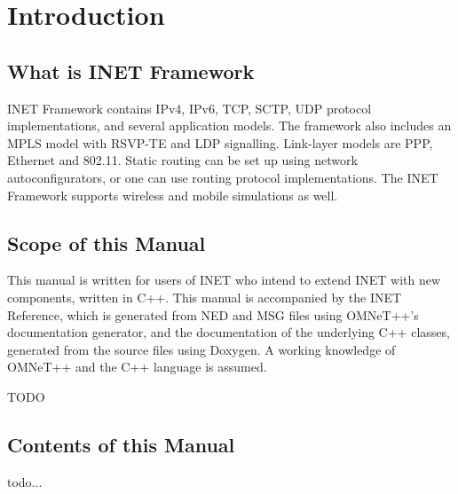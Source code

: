 \chapter{Introduction}
\label{cha:introduction}


\section{What is INET Framework}

INET Framework contains IPv4, IPv6, TCP, SCTP, UDP protocol implementations,
and several application models. The framework also includes an MPLS model
with RSVP-TE and LDP signalling. Link-layer models are PPP, Ethernet and 802.11.
Static routing can be set up using network autoconfigurators, or one can use
routing protocol implementations. The INET Framework supports wireless and
mobile simulations as well.


\section{Scope of this Manual}

This manual is written for users of INET who intend to extend INET with new 
components, written in C++. This manual is accompanied by the INET Reference,
which is generated from NED and MSG files using OMNeT++'s documentation generator, 
and the documentation of the underlying C++ classes, generated from the source files 
using Doxygen. A working knowledge of OMNeT++ and the C++ language is assumed.

\ifdraft TODO
\section{Contents of this Manual}

todo...
\fi



